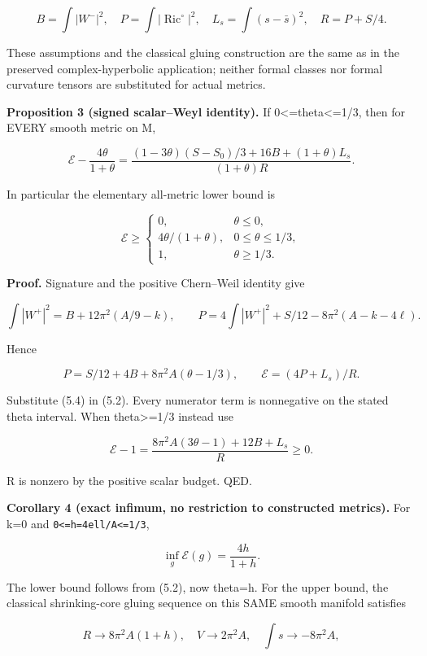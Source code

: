 \documentclass[
  10pt,
]{article}
\begin{document}
\[
 B=\int|W^-|^2,\quad P=\int|\operatorname{Ric}^{\circ}|^2,
 \quad L_s=\int(s-\bar s)^2,\quad R=P+S/4.
\]

These assumptions and the classical gluing construction are the same as
in the preserved complex-hyperbolic application; neither formal classes
nor formal curvature tensors are substituted for actual metrics.

\textbf{Proposition 3 (signed scalar--Weyl identity).} If
0\textless=theta\textless=1/3, then for EVERY smooth metric on M,

\[
 \boxed{\mathcal E-\frac{4\theta}{1+\theta}
   =\frac{(1-3\theta)(S-S_0)/3+16B+(1+\theta)L_s}
                {(1+\theta)R}.}                     \tag{5.2}
\]

In particular the elementary all-metric lower bound is

\[
 \mathcal E\ge
 \begin{cases}
 0,&\theta\le0,\\
 4\theta/(1+\theta),&0\le\theta\le1/3,\\
 1,&\theta\ge1/3.
 \end{cases}                                         \tag{5.3}
\]

\textbf{Proof.} Signature and the positive Chern--Weil identity give

\[
 \int|W^+|^2=B+12\pi^2(A/9-k),\qquad
 P=4\int|W^+|^2+S/12-8\pi^2(A-k-4\ell).
\]

Hence

\[
 P=S/12+4B+8\pi^2A(\theta-1/3),\qquad
 \mathcal E=(4P+L_s)/R.                              \tag{5.4}
\]

Substitute (5.4) in (5.2). Every numerator term is nonnegative on the
stated theta interval. When theta\textgreater=1/3 instead use

\[
 \mathcal E-1=
 \frac{8\pi^2A(3\theta-1)+12B+L_s}{R}\ge0.           \tag{5.5}
\]

R is nonzero by the positive scalar budget. QED.

\textbf{Corollary 4 (exact infimum, no restriction to constructed
metrics).} For k=0 and \texttt{0\textless{}=h=4ell/A\textless{}=1/3},

\[
                  \boxed{\inf_g\mathcal E(g)=\frac{4h}{1+h}.} \tag{5.6}
\]

The lower bound follows from (5.2), now theta=h. For the upper bound,
the classical shrinking-core gluing sequence on this SAME smooth
manifold satisfies

\[
 R\to8\pi^2A(1+h),\quad
 V\to2\pi^2A,\quad \int s\to-8\pi^2A,
\]
\end{document}

